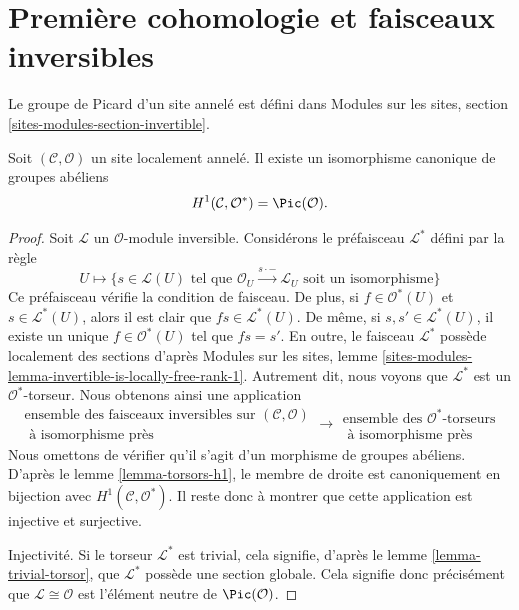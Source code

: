 \section{Première cohomologie et faisceaux inversibles}
\label{section-invertible-sheaves}

\noindent
Le groupe de Picard d'un site annelé est défini dans
Modules sur les sites, section \ref{sites-modules-section-invertible}.

\begin{lemma}
\label{lemma-h1-invertible}
Soit $(\mathcal{C}, \mathcal{O})$ un site localement annelé.
Il existe un isomorphisme canonique de groupes abéliens
$$
H^1(\mathcal{C}, \mathcal{O}^*) = \Pic(\mathcal{O}).
$$

\end{lemma}

\begin{proof}
Soit $\mathcal{L}$ un $\mathcal{O}$-module inversible.
Considérons le préfaisceau $\mathcal{L}^*$ défini par la règle
$$
U \longmapsto \{s \in \mathcal{L}(U)
\text{ tel que } \mathcal{O}_U \xrightarrow{s \cdot -} \mathcal{L}_U
\text{ soit un isomorphisme}\}
$$
Ce préfaisceau vérifie la condition de faisceau. De plus, si
$f \in \mathcal{O}^*(U)$ et $s \in \mathcal{L}^*(U)$, alors il est clair que
$fs \in \mathcal{L}^*(U)$. De même, si $s, s' \in \mathcal{L}^*(U)$,
il existe un unique $f \in \mathcal{O}^*(U)$ tel que
$fs = s'$. En outre, le faisceau $\mathcal{L}^*$ possède localement des sections
d'après Modules sur les sites, lemme
\ref{sites-modules-lemma-invertible-is-locally-free-rank-1}.
Autrement dit, nous
voyons que $\mathcal{L}^*$ est un $\mathcal{O}^*$-torseur. Nous obtenons ainsi
une application
$$
\begin{matrix}
\text{ensemble des faisceaux inversibles sur }(\mathcal{C}, \mathcal{O}) \\
\text{ à isomorphisme près}
\end{matrix}
\longrightarrow
\begin{matrix}
\text{ensemble des }\mathcal{O}^*\text{-torseurs} \\
\text{ à isomorphisme près}
\end{matrix}
$$
Nous omettons de vérifier qu'il s'agit d'un morphisme de groupes abéliens.
D'après le
lemme \ref{lemma-torsors-h1},
le membre de droite est canoniquement
en bijection avec $H^1(\mathcal{C}, \mathcal{O}^*)$.
Il reste donc à montrer que cette application est injective et surjective.

\medskip\noindent
Injectivité. Si le torseur $\mathcal{L}^*$ est trivial, cela signifie, d'après le
lemme \ref{lemma-trivial-torsor},
que $\mathcal{L}^*$ possède une section globale.
Cela signifie donc précisément que $\mathcal{L} \cong \mathcal{O}$ est
l'élément neutre de $\Pic(\mathcal{O})$.


\end{proof}
